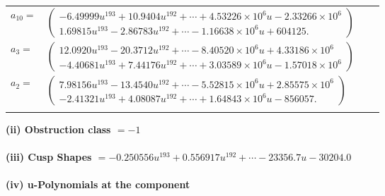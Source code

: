 \documentclass[1p]{elsarticle_modified}
\theoremstyle{definition}
\begin{document}
\begin{tabular}{m{7pt} m{180pt} m{7pt} m{180pt} }
\flushright $a_{10}=$&$\begin{pmatrix}-6.49999 u^{193}+10.9404 u^{192}+\cdots+4.53226\times10^{6} u-2.33266\times10^{6}\\1.69815 u^{193}-2.86783 u^{192}+\cdots-1.16638\times10^{6} u+604125.\end{pmatrix}$ \\
\flushright $a_{3}=$&$\begin{pmatrix}12.0920 u^{193}-20.3712 u^{192}+\cdots-8.40520\times10^{6} u+4.33186\times10^{6}\\-4.40681 u^{193}+7.44176 u^{192}+\cdots+3.03589\times10^{6} u-1.57018\times10^{6}\end{pmatrix}$ \\
\flushright $a_{2}=$&$\begin{pmatrix}7.98156 u^{193}-13.4540 u^{192}+\cdots-5.52815\times10^{6} u+2.85575\times10^{6}\\-2.41321 u^{193}+4.08087 u^{192}+\cdots+1.64843\times10^{6} u-856057.\end{pmatrix}$\\&\end{tabular}
\flushleft \textbf{(ii) Obstruction class $= -1$}\\~\\
\flushleft \textbf{(iii) Cusp Shapes $= -0.250556 u^{193}+0.556917 u^{192}+\cdots-23356.7 u-30204.0$}\\~\\
\newpage\renewcommand{\arraystretch}{1}
\flushleft \textbf{(iv) u-Polynomials at the component}\newline \\
\end{document}
